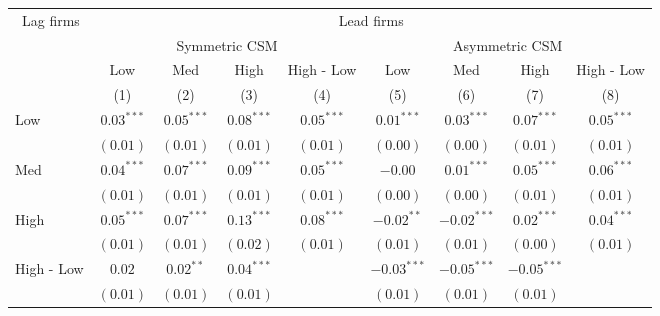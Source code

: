 \documentclass[
]{article}
\author{}
\date{\vspace{-2.5em}}
\begin{document}
\begin{tabular}{lcccccccc}
   \toprule \ Lag firms & \multicolumn{8}{c}{Lead firms} \\
 \cmidrule(l){2-9} & \multicolumn{4}{c}{Symmetric CSM} & \multicolumn{4}{c}{Asymmetric CSM} \\
 \cmidrule(l){2-5} \cmidrule(l){2-9}  & Low & Med & High & High - Low & Low & Med & High & High - Low \\ 
   \cmidrule(l){2-4} \cmidrule(l){5-5} \cmidrule(l){6-8} \cmidrule(l){9-9} \vspace{5pt} & (1) & (2) & (3) & (4) & (5) & (6) & (7) & (8) \\ 
  Low & $0.03^{***}$ & $0.05^{***}$ & $0.08^{***}$ & $0.05^{***}$ & $0.01^{***}$ & $0.03^{***}$ & $0.07^{***}$ & $0.05^{***}$ \\ 
   & $(0.01)$ & $(0.01)$ & $(0.01)$ & $(0.01)$ & $(0.00)$ & $(0.00)$ & $(0.01)$ & $(0.01)$ \\ 
  Med & $0.04^{***}$ & $0.07^{***}$ & $0.09^{***}$ & $0.05^{***}$ & $-0.00$ & $0.01^{***}$ & $0.05^{***}$ & $0.06^{***}$ \\ 
   & $(0.01)$ & $(0.01)$ & $(0.01)$ & $(0.01)$ & $(0.00)$ & $(0.00)$ & $(0.01)$ & $(0.01)$ \\ 
  High & $0.05^{***}$ & $0.07^{***}$ & $0.13^{***}$ & $0.08^{***}$ & $-0.02^{**}$ & $-0.02^{***}$ & $0.02^{***}$ & $0.04^{***}$ \\ 
   \vspace{10pt} & $(0.01)$ & $(0.01)$ & $(0.02)$ & $(0.01)$ & $(0.01)$ & $(0.01)$ & $(0.00)$ & $(0.01)$ \\ 
  High - Low & $0.02$ & $0.02^{**}$ & $0.04^{***}$ &  & $-0.03^{***}$ & $-0.05^{***}$ & $-0.05^{***}$ &  \\ 
   & $(0.01)$ & $(0.01)$ & $(0.01)$ &  & $(0.01)$ & $(0.01)$ & $(0.01)$ &  \\ 
   \bottomrule 
\end{tabular}
\end{document}
